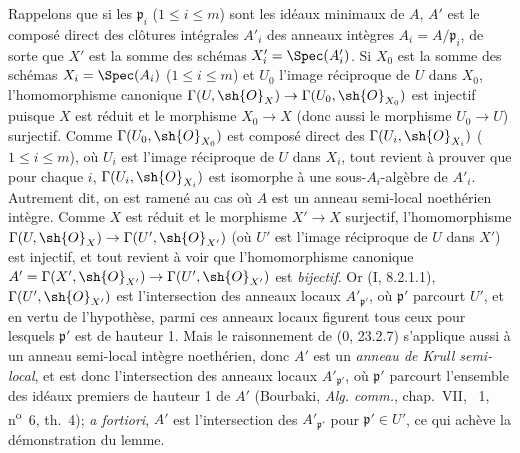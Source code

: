 Rappelons que si les $\mathfrak p_i$ ($1\leq i\leq m$) sont les idéaux minimaux de $A$, $A'$ est le composé direct des clôtures intégrales $A'_i$ des anneaux intègres $A_i=A/\mathfrak p_i$, de sorte que $X'$ est la somme des schémas $X'_i=\Spec(A'_i)$. Si $X_0$ est la somme des schémas $X_i=\Spec(A_i)$ ($1\leq i\leq m$) et $U_0$ l'image réciproque de $U$ dans $X_0$, l'homomorphisme canonique $\Gamma(U,\sh{O}_X)\to\Gamma(U_0,\sh{O}_{X_0})$ est injectif puisque $X$ est réduit et le morphisme $X_0\to X$ (donc aussi le morphisme $U_0\to U$) surjectif. Comme $\Gamma(U_0,\sh{O}_{X_0})$ est composé direct des $\Gamma(U_i,\sh{O}_{X_i})$ ($1\leq i\leq m$), où $U_i$ est l'image réciproque de $U$ dans $X_i$, tout revient à prouver que pour chaque $i$, $\Gamma(U_i,\sh{O}_{X_i})$ est isomorphe à une sous-$A_i$-algèbre de $A'_i$. Autrement dit, on est ramené au cas où $A$ est un anneau semi-local noethérien intègre. Comme $X$ est réduit et le morphisme $X'\to X$ surjectif, l'homomorphisme $\Gamma(U,\sh{O}_X)\to\Gamma(U',\sh{O}_{X'})$ (où $U'$ est l'image réciproque de $U$ dans $X'$) est injectif, et tout revient à voir que l'homomorphisme canonique $A'=\Gamma(X',\sh{O}_{X'})\to\Gamma(U',\sh{O}_{X'})$ est \emph{bijectif}. Or (I, 8.2.1.1), $\Gamma(U',\sh{O}_{X'})$ est l'intersection des anneaux locaux $A'_{\mathfrak p'}$, où $\mathfrak p'$ parcourt $U'$, et en vertu de l'hypothèse, parmi ces anneaux locaux figurent tous ceux pour lesquels $\mathfrak p'$ est de hauteur 1. Mais le raisonnement de (0, 23.2.7) s'applique aussi à un anneau semi-local intègre noethérien, donc $A'$ est un \emph{anneau de Krull semi-local}, et est donc l'intersection des anneaux locaux $A'_{\mathfrak p'}$, où $\mathfrak p'$ parcourt l'ensemble des idéaux premiers de hauteur 1 de $A'$ (Bourbaki, \emph{Alg. comm.}, chap.~VII, \textsection~1, n\textsuperscript{o}~6, th.~4); \emph{a fortiori}, $A'$ est l'intersection des $A'_{\mathfrak p'}$ pour $\mathfrak p'\in U'$, ce qui achève la démonstration du lemme.


